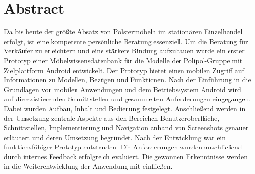 \section*{Abstract}

Da bis heute der größte Absatz von Polstermöbeln im stationären Einzelhandel erfolgt, ist eine kompetente persönliche Beratung essenziell. Um die Beratung für Verkäufer zu erleichtern und eine stärkere Bindung aufzubauen wurde ein erster Prototyp einer Möbelwissensdatenbank für die Modelle der Polipol-Gruppe mit Zielplattform Android entwickelt. Der Prototyp bietet einen mobilen Zugriff auf Informationen zu Modellen, Bezügen und Funktionen. Nach der Einführung in die Grundlagen von mobilen Anwendungen und dem Betriebssystem Android wird auf die existierenden Schnittstellen und gesammelten Anforderungen eingegangen. Dabei wurden Aufbau, Inhalt und Bedienung festgelegt. Anschließend werden in der Umsetzung zentrale Aspekte aus den Bereichen Benutzeroberfläche, Schnittstellen, Implementierung und Navigation anhand von Screenshots genauer erläutert und deren Umsetzung begründet. Nach der Entwicklung war ein funktionsfähiger Prototyp entstanden. Die Anforderungen wurden anschließend durch internes Feedback erfolgreich evaluiert. Die gewonnen Erkenntnisse werden in die Weiterentwicklung der Anwendung mit einfließen.

\newpage
\fancyhead[R]{\leftmark}